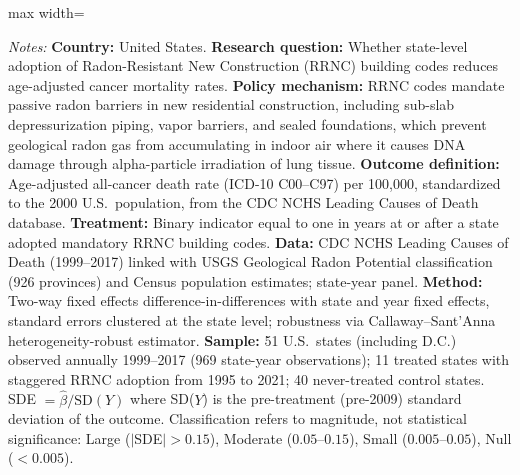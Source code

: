 \begin{table}[H]
\begin{adjustbox}{max width=\textwidth}
\begin{threeparttable}
\begin{tablenotes}[flushleft]
\item \textit{Notes:} \textbf{Country:} United States. \textbf{Research question:} Whether state-level adoption of Radon-Resistant New Construction (RRNC) building codes reduces age-adjusted cancer mortality rates. \textbf{Policy mechanism:} RRNC codes mandate passive radon barriers in new residential construction, including sub-slab depressurization piping, vapor barriers, and sealed foundations, which prevent geological radon gas from accumulating in indoor air where it causes DNA damage through alpha-particle irradiation of lung tissue. \textbf{Outcome definition:} Age-adjusted all-cancer death rate (ICD-10 C00--C97) per 100,000, standardized to the 2000 U.S.\ population, from the CDC NCHS Leading Causes of Death database. \textbf{Treatment:} Binary indicator equal to one in years at or after a state adopted mandatory RRNC building codes. \textbf{Data:} CDC NCHS Leading Causes of Death (1999--2017) linked with USGS Geological Radon Potential classification (926 provinces) and Census population estimates; state-year panel. \textbf{Method:} Two-way fixed effects difference-in-differences with state and year fixed effects, standard errors clustered at the state level; robustness via Callaway--Sant'Anna heterogeneity-robust estimator. \textbf{Sample:} 51 U.S.\ states (including D.C.) observed annually 1999--2017 (969 state-year observations); 11 treated states with staggered RRNC adoption from 1995 to 2021; 40 never-treated control states. SDE $= \hat{\beta} / \text{SD}(Y)$ where SD($Y$) is the pre-treatment (pre-2009) standard deviation of the outcome. Classification refers to magnitude, not statistical significance: Large ($|$SDE$| > 0.15$), Moderate ($0.05$--$0.15$), Small ($0.005$--$0.05$), Null ($< 0.005$).
\end{tablenotes}
\end{threeparttable}
\end{adjustbox}
\end{table}
